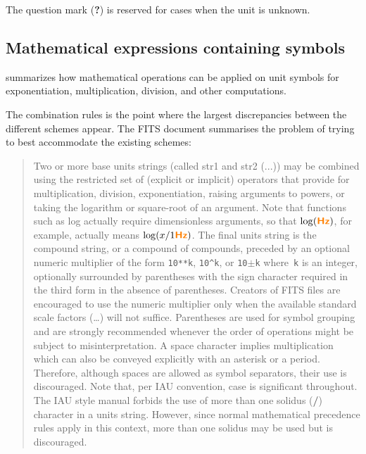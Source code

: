 \documentclass[11pt,notitlepage,onecolumn]{ivoa}
\newcommand{\unit}[1]{\textbf{\textsf{\color{orange}#1}}}
\begin{document}
The question mark (\unit{?}) is reserved for cases when the unit is unknown.


\subsection{Mathematical expressions containing symbols}

 summarizes how mathematical operations can be applied on
unit symbols for exponentiation, multiplication, division, and other computations.



The combination rules is the point where the largest discrepancies between the
different schemes appear. The FITS document summarises the problem of
trying to best accommodate the existing schemes:
\label{sec:fitsquote}
\begin{quote}
Two or more base units strings (called str1 and str2 (...)) may be combined using
the restricted set of (explicit or implicit) operators that provide
for multiplication, division, exponentiation, raising arguments
to powers, or taking the logarithm or square-root of an
argument. Note that functions such as log actually require dimensionless
arguments, so that $\log(\unit{Hz})$, for example, actually
means $\log(x/1 \unit{Hz})$. The final units string is the compound
string, or a compound of compounds, preceded by an
optional numeric multiplier of the form \texttt{10**k}, \texttt{10\^{}k}, or \texttt{10$\pm$k}
where~\texttt k is an integer, optionally surrounded by parentheses with
the sign character required in the third form in the absence of 
parentheses. Creators of FITS files are encouraged to use the
numeric multiplier only when the available standard scale factors
(\dots) will not suffice. Parentheses are used for symbol
grouping and are strongly recommended whenever the order
of operations might be subject to misinterpretation. A space
character implies multiplication which can also be conveyed explicitly
with an asterisk or a period. Therefore, although spaces
are allowed as symbol separators, their use is discouraged. Note
that, per IAU convention, case is significant throughout. The IAU
style manual forbids the use of more than one solidus (\unit{/}) character
in a units string. However, since normal mathematical precedence
rules apply in this context, more than one solidus may be
used but is discouraged.


\end{quote}
\end{document}
